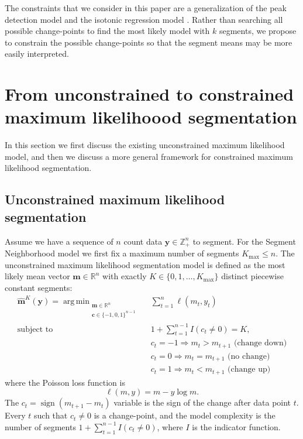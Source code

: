\documentclass{article}
\DeclareMathOperator*{\argmin}{arg\,min}
\DeclareMathOperator*{\sign}{sign}
\newcommand{\ZZ}{\mathbb Z}
\newcommand{\RR}{\mathbb R}
\begin{document}
The constraints that we consider in this paper are a generalization of
the peak detection model \citep{PeakSeg} and the isotonic regression
model \citep{mair2009isotone}. Rather than searching all possible
change-points to find the most likely model with $k$ segments, we
propose to constrain the possible change-points so that the segment
means may be more easily interpreted.

\section{From unconstrained to constrained maximum likelihoood
  segmentation}
\label{sec:model}

In this section we first discuss the existing unconstrained maximum
likelihood model, and then we discuss a more general framework for
constrained maximum likelihood segmentation.

\subsection{Unconstrained maximum likelihood segmentation}

Assume we have a sequence of $n$ count data $\mathbf y\in\ZZ_+^n$ to
segment. For the Segment Neighborhood model we first fix a maximum
number of segments $ K_{\max}\leq n$. The unconstrained maximum
likelihood segmentation model is defined as the most likely mean
vector $\mathbf m\in\RR^n$ with exactly 
$K\in\{0, 1, \dots, K_{\max}\}$ distinct piecewise constant segments:
\begin{align}
  \label{unconstrained}
  \mathbf{\hat m}^K(\mathbf y) =
    \argmin_{\substack{
  \mathbf m\in\RR^{n}
\\
  \mathbf c\in\{-1,0,1\}^{n-1}
  }} &\ \ 
    \sum_{t=1}^n \ell( m_t,  y_t) 
\\
    \text{subject to} &\ \  1+\sum_{t=1}^{n-1} I(c_t \neq 0) = K, 
\nonumber\\
& \ \ c_t = -1 \Rightarrow m_{t} > m_{t+1} \text{ (change down)}
\nonumber\\
& \ \ c_t = 0 \Rightarrow m_{t} = m_{t+1}  \text{ (no change)}
\nonumber\\
& \ \ c_t = 1 \Rightarrow m_{t} < m_{t+1} \text{ (change up)}
\nonumber
\end{align}
where the Poisson loss function is
\begin{equation}\label{eq:loss}
  \ell( m,  y)= m - y \log m.
\end{equation} 
The $c_t = \sign(m_{t+1} - m_{t})$ variable is the sign of the change
after data point $t$. Every $t$ such that $c_t \neq 0$ is a
change-point, and the model complexity is the number of segments
$1+\sum_{t=1}^{n-1} I(c_t \neq 0)$, where $I$ is the indicator function.
\end{document}
